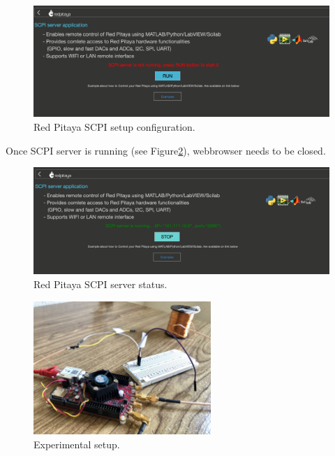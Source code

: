 \documentclass[12pt]{extarticle}
\begin{document}
\begin{figure}[!h]
	\begin{center}
		\includegraphics[width=1\textwidth]{images2/connect-12} 
		\caption{Red Pitaya SCPI setup configuration.}
		\label{fig:squemeXX}
	\end{center}
\end{figure}

Once SCPI server is running (see Figure\ref{fig:squemexxx}), webbrowser needs to be closed.

\begin{figure}[!h]
	\begin{center}
		\includegraphics[width=1\textwidth]{images2/connect-13} 
		\caption{Red Pitaya SCPI server status.}
		\label{fig:squemexxx}
	\end{center}
\end{figure}


\begin{figure}%
	\begin{center}
		\includegraphics[width=0.6\textwidth]{images2/setup.png} 
		\caption{Experimental setup.}
		\label{fig:setup}
	\end{center}
\end{figure}
\end{document}
